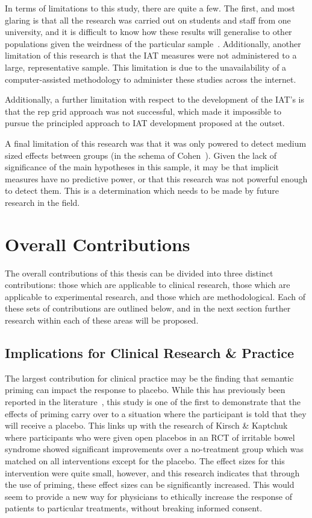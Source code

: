 In terms of limitations to this study, there are quite a few. The first, and most glaring is that all the research was carried out on students and staff from one university, and it is difficult to know how these results will generalise to other populations given the weirdness of the particular sample~\cite{henrich2010most}. Additionally, another limitation of this research is that the IAT measures were not administered to a large, representative  sample. This limitation is due to the unavailability of a computer-assisted methodology to administer these studies across the internet. 

Additionally, a further limitation with respect to the development of the IAT's is that the rep grid approach was not successful, which made it impossible to pursue the principled approach to IAT development proposed at the outset. 

A final limitation of this research was that it was only powered to detect medium sized effects between groups (in the schema of Cohen~\cite{cohen1988statistical}). Given the lack of significance of the main hypotheses in this sample, it may be that implicit measures have no predictive power, or that this research was not powerful enough to detect them. This is a determination which needs to be made by future research in the field. 


\section{Overall Contributions}
\label{sec:over-contr}

The overall contributions of this thesis can be divided into three distinct contributions: those which are applicable to clinical research, those which are applicable to experimental research, and those which are methodological. Each of these sets of contributions are outlined below, and in the next section further research within each of these areas will be proposed. 

\subsection{Implications for Clinical Research \& Practice}
\label{sec:impl-clin-rese}

The largest contribution for clinical practice may be the finding that semantic priming can impact the response to placebo. While this has previously been reported in the literature~\cite{Geers2005a,Jensen1991}, this study is one of the first to demonstrate that the effects of priming carry over to a situation where the participant is told that they will receive a placebo. This links up with the research of Kirsch \& Kaptchuk~\cite{kaptchuk2010placebos} where participants who were given open placebos in an RCT of irritable bowel syndrome showed significant improvements over a no-treatment group which was matched on all interventions except for the placebo. The effect sizes for this intervention were quite small, however, and this research indicates that through the use of priming, these effect sizes can be significantly increased. This would seem to provide a new way for physicians to ethically increase the response of patients to particular treatments, without breaking informed consent. 

